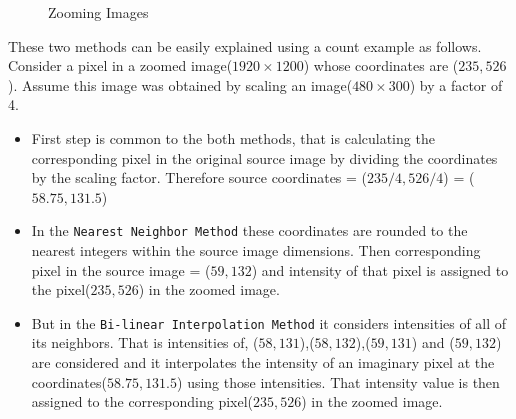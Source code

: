 \documentclass[a4paper,10pt]{article}%
\begin{document}
\begin{figure}[!h]
	\centering
	\caption{Zooming Images}
\end{figure}

These two methods can be easily explained using a count example as follows. Consider a pixel in a zoomed image($1920 \times1200$) whose coordinates are ($235,526$). Assume this image was obtained by scaling an image($480\times300$) by a factor of 4.

\begin{itemize}
	\item First step is common to the both methods, that is calculating the corresponding pixel in the original source image by dividing the coordinates by the scaling factor. Therefore source coordinates = ($235/4,526/4$) = ($58.75, 131.5$)
	\item In the {\tt Nearest Neighbor Method} these coordinates are rounded to the nearest integers within the source image dimensions. Then corresponding pixel in the source image = ($59, 132$) and intensity of that pixel is assigned to the pixel($235,526$) in the zoomed image.
	\item But in the {\tt Bi-linear Interpolation Method} it considers intensities of all of its neighbors. That is intensities of, ($58, 131$),($58, 132$),($59, 131$) and ($59, 132$) are considered and it interpolates the intensity of an imaginary pixel at the coordinates($58.75, 131.5$) using those intensities. That intensity value is then assigned to the corresponding pixel($235,526$) in the zoomed image.
\end{itemize}
\end{document}
